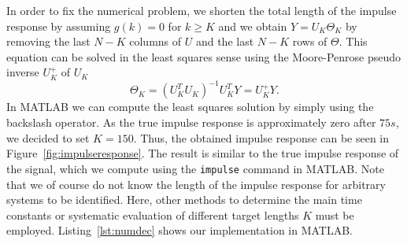 \documentclass{scrartcl}
\newcommand*{\matlabcode}[3]{\begin{figure}[h!]\end{figure}}
\begin{document}
In order to fix the numerical problem, we shorten the total length of the impulse response by assuming $g(k) = 0$ for $k \geq K$ and we obtain $Y = U_{K} \Theta_{K}$ by removing the last $N-K$ columns of $U$ and the last $N-K$ rows of $\Theta$. 
This equation can be solved in the least squares sense using the Moore-Penrose pseudo inverse $U_{K}^+$ of $U_{K}$
\begin{equation}
	\Theta_{K} = (U^{T}_{K} U_{K})^{-1} U^{T}_{K} Y = U_{K}^{+} Y.
\end{equation}
In MATLAB we can compute the least squares solution by simply using the backslash operator.
As the true impulse response is approximately zero after $75 s$, we decided to set $K = 150$. Thus, the obtained impulse response can be seen in Figure~\ref{fig:impulseresponse}. The result is similar to the true impulse response of the signal, which we compute using the \verb|impulse| command in MATLAB.
Note that we of course do not know the length of the impulse response for arbitrary systems to be identified. 
Here, other methods to determine the main time constants or systematic evaluation of different target lengths $K$ must be employed.
Listing~\ref{lst:numdec} shows our implementation in MATLAB.
\matlabcode{../matlab/ce1/estimate_impulse_response_numdec.m}{Estimator of the impulse response via numerical deconvolution in MATLAB.}{lst:numdec}
\end{document}
